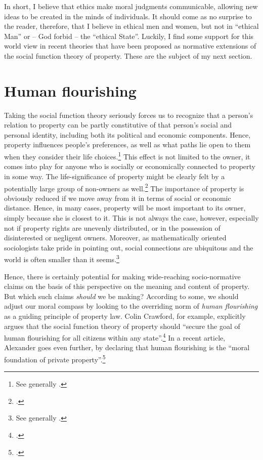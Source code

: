 In short, I believe that ethics make moral judgments communicable, allowing new ideas to be created in the minds of individuals. It should come as no surprise to the reader, therefore, that I believe in ethical men and women, but not in ``ethical Man'' or -- God forbid --  the ``ethical State''. Luckily, I find some support for this world view in recent theories that have been proposed as normative extensions of the social function theory of property. These are the subject of my next section.

\section{Human flourishing}\label{sec:hf}

Taking the social function theory seriously forces us to recognize that a person's relation to property can be partly constitutive of that person's social and personal identity, including both its political and economic components. Hence, property influences people's preferences, as well as what paths lie open to them when they consider their life choices.\footnote{See generally \cite{alexander09}.} This effect is not limited to the owner, it comes into play for anyone who is socially or economically connected to property in some way. The life-significance of property might be clearly felt by a potentially large group of non-owners as well.\footcite[128-129]{alexander09d} The importance of property is obviously reduced if we move away from it in terms of social or economic distance. Hence, in many cases, property will be most important to its owner, simply because she is closest to it. This is not always the case, however, especially not if property rights are unevenly distributed, or in the possession of disinterested or negligent owners. Moreover, as mathematically oriented sociologists take pride in pointing out, social connections are ubiquitous  and the world is often smaller than it seems.\footnote{See generally \cite{schnettler09}.}

Hence, there is certainly potential for making wide-reaching socio-normative claims on the basis of this perspective on the meaning and content of property. But which such claims {\it should} we be making? According to some, we should adjust our moral compass by looking to the overriding norm of {\it human flourishing} as a guiding principle of property law. Colin Crawford, for example, explicitly argues that the social function theory of property should ``secure the goal of human flourishing for all citizens within any state''.\footcite[1089]{crawford11} In a recent article, Alexander goes even further, by declaring that human flourishing is the ``moral foundation of private property''.\footcite[1261]{alexander14} 


